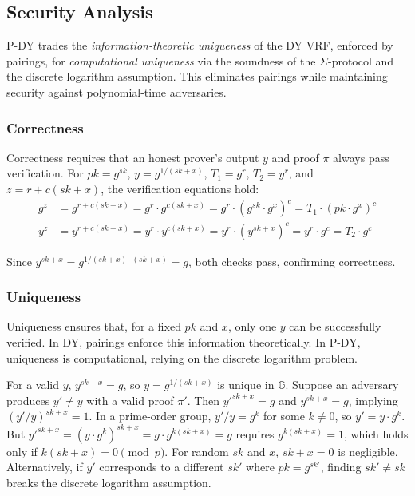 \subsection{Security Analysis}

\begin{remark}
P-DY trades the \emph{information-theoretic uniqueness} of the DY VRF, enforced by pairings, for \emph{computational uniqueness} via the soundness of the $\Sigma$-protocol and the discrete logarithm assumption. This eliminates pairings while maintaining security against polynomial-time adversaries.
\end{remark}

\subsubsection{Correctness}

Correctness requires that an honest prover’s output $y$ and proof $\pi$ always pass verification. For $pk = g^{sk}$, $y = g^{1/(sk + x)}$, $T_1 = g^r$, $T_2 = y^r$, and $z = r + c(sk + x)$, the verification equations hold:
\begin{align*}
g^z &= g^{r + c(sk + x)} = g^r \cdot g^{c(sk + x)} = g^r \cdot (g^{sk} \cdot g^x)^c = T_1 \cdot (pk \cdot g^x)^c \\
y^z &= y^{r + c(sk + x)} = y^r \cdot y^{c(sk + x)} = y^r \cdot (y^{sk + x})^c = y^r \cdot g^c = T_2 \cdot g^c
\end{align*}

Since $y^{sk + x} = g^{1/(sk + x) \cdot (sk + x)} = g$, both checks pass, confirming correctness.

\subsubsection{Uniqueness}

Uniqueness ensures that, for a fixed $pk$ and $x$, only one $y$ can be successfully verified. In DY, pairings enforce this information theoretically. In P-DY, uniqueness is computational, relying on the discrete logarithm problem.

For a valid $y$, $y^{sk + x} = g$, so $y = g^{1/(sk + x)}$ is unique in $\mathbb{G}$. Suppose an adversary produces $y' \neq y$ with a valid proof $\pi'$. Then $y'^{sk + x} = g$ and $y^{sk + x} = g$, implying $(y'/y)^{sk + x} = 1$. In a prime-order group, $y'/y = g^k$ for some $k \neq 0$, so $y' = y \cdot g^k$. But $y'^{sk + x} = (y \cdot g^k)^{sk + x} = g \cdot g^{k(sk + x)} = g$ requires $g^{k(sk + x)} = 1$, which holds only if $k(sk + x) = 0 \pmod{p}$. For random $sk$ and $x$, $sk + x = 0$ is negligible. Alternatively, if $y'$ corresponds to a different $sk'$ where $pk = g^{sk'}$, finding $sk' \neq sk$ breaks the discrete logarithm assumption.

